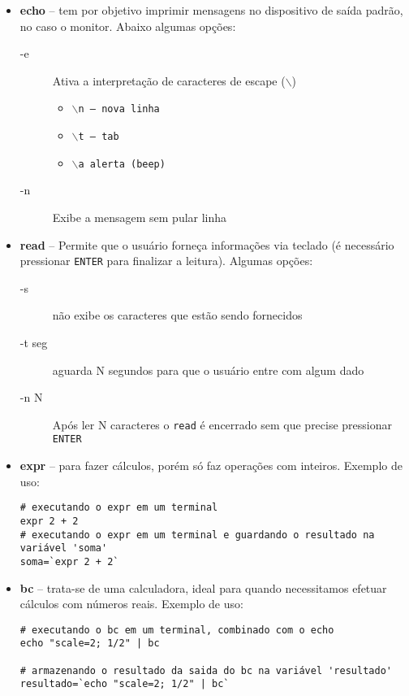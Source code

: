 \documentclass[11pt]{ifscarticle}
\begin{document}
\begin{itemize}
	\item \textbf{echo} -- tem por objetivo imprimir mensagens no dispositivo de saída padrão, no caso o monitor. Abaixo algumas opções:
	\begin{description}
		\item[-e] Ativa a interpretação de caracteres de escape (\texttt{$\backslash$})
		\begin{itemize}
			\item $\backslash$\texttt{n -- nova linha}
			\item $\backslash$\texttt{t -- tab}
			\item $\backslash$\texttt{a alerta (beep)}
		\end{itemize}
		\item[-n] Exibe a mensagem sem pular linha
	\end{description}
	\item \textbf{read} -- Permite que o usuário forneça informações via teclado (é necessário pressionar \texttt{ENTER} para finalizar a leitura). Algumas opções:
	\begin{description}
		\item[-s] não exibe os caracteres que estão sendo fornecidos
		\item[-t seg] aguarda N segundos para que o usuário entre com algum dado
		\item[-n N] Após ler N caracteres o \texttt{read} é encerrado sem que precise pressionar \texttt{ENTER} 
	\end{description}
	\item \textbf{expr} -- para fazer cálculos, porém só faz operações com inteiros. Exemplo de uso: 
\begin{lstlisting}
# executando o expr em um terminal
expr 2 + 2
# executando o expr em um terminal e guardando o resultado na variável 'soma'
soma=`expr 2 + 2`
\end{lstlisting}
	\item \textbf{bc} -- trata-se de uma calculadora, ideal para quando necessitamos efetuar cálculos com números reais. Exemplo de uso: 
\begin{lstlisting}
# executando o bc em um terminal, combinado com o echo
echo "scale=2; 1/2" | bc

# armazenando o resultado da saida do bc na variável 'resultado'
resultado=`echo "scale=2; 1/2" | bc`
\end{lstlisting}

\end{itemize}
\end{document}
